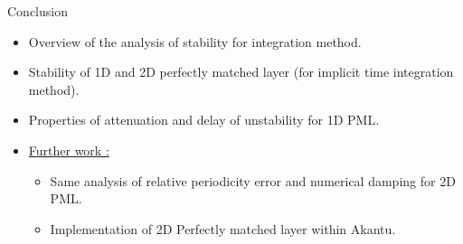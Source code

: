 \begin{frame}{Conclusion}
\begin{itemize}
\item Overview of the analysis of stability for integration method.
\item Stability of 1D and 2D perfectly matched layer (for implicit time integration method).
\item Properties of attenuation and delay of unstability for 1D PML.
\item \underline{Further work :}
\begin{itemize}
\item Same analysis of relative periodicity error and numerical damping for 2D PML.
\item Implementation of 2D Perfectly matched layer within Akantu. 
\end{itemize} 
\end{itemize}
\end{frame}